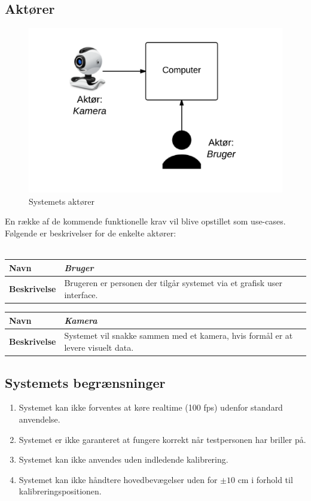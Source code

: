\documentclass[analyse.tex]{subfiles}
\begin{document}
\subsection{Aktører}
\begin{figure}[h]
\centering
\includegraphics[width=0.7\linewidth]{../Actors}
\caption{Systemets aktører}
\label{fig:Actors}
\end{figure}

En række af de kommende funktionelle krav vil blive opstillet som use-cases. Følgende er beskrivelser for de enkelte aktører: \\
\\
\begin{tabular}{| l | p{10cm} |}
	\hline 
	\textbf{Navn} & \textit{Bruger} \\ \hline
	\textbf{Beskrivelse} & Brugeren er personen der tilgår systemet via et grafisk user interface.\\ \hline
\end{tabular}
\newline
\vspace*{0.7 cm}
\newline
\begin{tabular}{| l | p{10cm} |}
	\hline 
	\textbf{Navn} & \textit{Kamera} \\ \hline
	\textbf{Beskrivelse} & Systemet vil snakke sammen med et kamera, hvis formål er at levere visuelt data.\\ \hline
\end{tabular}

\subsection{Systemets begrænsninger}
\begin{enumerate}
	\item Systemet kan ikke forventes at køre realtime (100 fps) udenfor standard anvendelse.
\item 
Systemet er ikke garanteret at fungere korrekt når testpersonen har briller på.
\item 
Systemet kan ikke anvendes uden indledende kalibrering.
\item 
Systemet kan ikke håndtere hovedbevægelser uden for $\pm10$ cm i forhold til kalibreringspositionen.
\end{enumerate}
\end{document}
